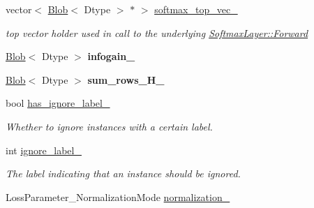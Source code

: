 \begin{DoxyCompactItemize}
vector$<$ \mbox{\hyperlink{classcaffe_1_1_blob}{Blob}}$<$ Dtype $>$ $\ast$ $>$ \mbox{\hyperlink{classcaffe_1_1_infogain_loss_layer_aaad8260753f21cdd54631870128297ad}{softmax\+\_\+top\+\_\+vec\+\_\+}}
\begin{DoxyCompactList}\small\item\em top vector holder used in call to the underlying \mbox{\hyperlink{classcaffe_1_1_layer_ab57d272dabe8c709d2a785eebe72ca57}{Softmax\+Layer\+::\+Forward}} \end{DoxyCompactList}\item 
\mbox{\label{classcaffe_1_1_infogain_loss_layer_a7ad59c638cc23fbf53c2014375ae2b88}} 
\mbox{\hyperlink{classcaffe_1_1_blob}{Blob}}$<$ Dtype $>$ {\bfseries infogain\+\_\+}
\item 
\mbox{\label{classcaffe_1_1_infogain_loss_layer_a27ea069c3bfd42e4b476696314285964}} 
\mbox{\hyperlink{classcaffe_1_1_blob}{Blob}}$<$ Dtype $>$ {\bfseries sum\+\_\+rows\+\_\+\+H\+\_\+}
\item 
\mbox{\label{classcaffe_1_1_infogain_loss_layer_a421720fc0f85daf8b6b7808719b1f9e8}} 
bool \mbox{\hyperlink{classcaffe_1_1_infogain_loss_layer_a421720fc0f85daf8b6b7808719b1f9e8}{has\+\_\+ignore\+\_\+label\+\_\+}}
\begin{DoxyCompactList}\small\item\em Whether to ignore instances with a certain label. \end{DoxyCompactList}\item 
\mbox{\label{classcaffe_1_1_infogain_loss_layer_ad3f7c2efdf32f99510186495ba7c5cff}} 
int \mbox{\hyperlink{classcaffe_1_1_infogain_loss_layer_ad3f7c2efdf32f99510186495ba7c5cff}{ignore\+\_\+label\+\_\+}}
\begin{DoxyCompactList}\small\item\em The label indicating that an instance should be ignored. \end{DoxyCompactList}\item 
\mbox{\label{classcaffe_1_1_infogain_loss_layer_ab7fe88c996d31d67f5e13fc0ffc803c2}} 
Loss\+Parameter\+\_\+\+Normalization\+Mode \mbox{\hyperlink{classcaffe_1_1_infogain_loss_layer_ab7fe88c996d31d67f5e13fc0ffc803c2}{normalization\+\_\+}}

\end{DoxyCompactItemize}
